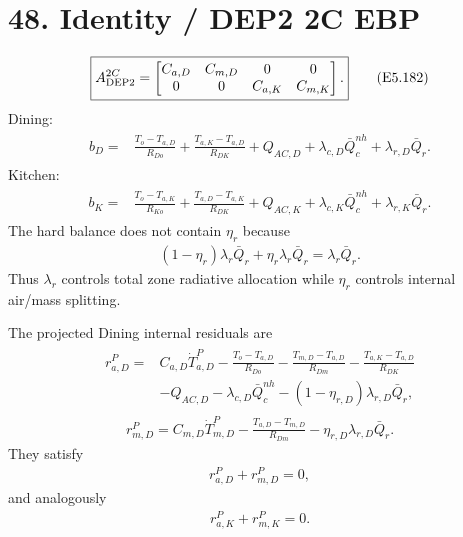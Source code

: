 \documentclass[11pt]{article}
\begin{document}
\section*{48. Identity / DEP2 2C EBP}

\begin{align}
\boxed{A_{\rm DEP2}^{2C}=\begin{bmatrix}C_{a,D}&C_{m,D}&0&0\\0&0&C_{a,K}&C_{m,K}\end{bmatrix}.}
\tag{E5.182}
\end{align}
Dining:
\begin{align}
\boxed{\begin{aligned}b_D={}&\frac{T_o-T_{a,D}}{R_{Do}}+\frac{T_{a,K}-T_{a,D}}{R_{DK}}+Q_{AC,D}+\lambda_{c,D}\bar Q_c^{nh}+\lambda_{r,D}\bar Q_r.\end{aligned}}
\tag{E5.183}
\end{align}
Kitchen:
\begin{align}
\boxed{\begin{aligned}b_K={}&\frac{T_o-T_{a,K}}{R_{Ko}}+\frac{T_{a,D}-T_{a,K}}{R_{DK}}+Q_{AC,K}+\lambda_{c,K}\bar Q_c^{nh}+\lambda_{r,K}\bar Q_r.\end{aligned}}
\tag{E5.184}
\end{align}
The hard balance does not contain \(\eta_r\) because
\begin{align}
\boxed{(1-\eta_r)\lambda_r\bar Q_r+\eta_r\lambda_r\bar Q_r=\lambda_r\bar Q_r.}
\tag{E5.185}
\end{align}
Thus \(\lambda_r\) controls total zone radiative allocation while \(\eta_r\) controls internal air/mass splitting.

The projected Dining internal residuals are
\begin{align}
\boxed{\begin{aligned}r_{a,D}^{P}={}&C_{a,D}\dot T_{a,D}^{P}-\frac{T_o-T_{a,D}}{R_{Do}}-\frac{T_{m,D}-T_{a,D}}{R_{Dm}}-\frac{T_{a,K}-T_{a,D}}{R_{DK}}\\&-Q_{AC,D}-\lambda_{c,D}\bar Q_c^{nh}-(1-\eta_{r,D})\lambda_{r,D}\bar Q_r,\end{aligned}}
\tag{E5.186}
\end{align}
\begin{align}
\boxed{r_{m,D}^{P}=C_{m,D}\dot T_{m,D}^{P}-\frac{T_{a,D}-T_{m,D}}{R_{Dm}}-\eta_{r,D}\lambda_{r,D}\bar Q_r.}
\tag{E5.187}
\end{align}
They satisfy
\begin{align}
\boxed{r_{a,D}^{P}+r_{m,D}^{P}=0,}
\tag{E5.188}
\end{align}
and analogously
\begin{align}
\boxed{r_{a,K}^{P}+r_{m,K}^{P}=0.}
\tag{E5.189}
\end{align}
\end{document}
